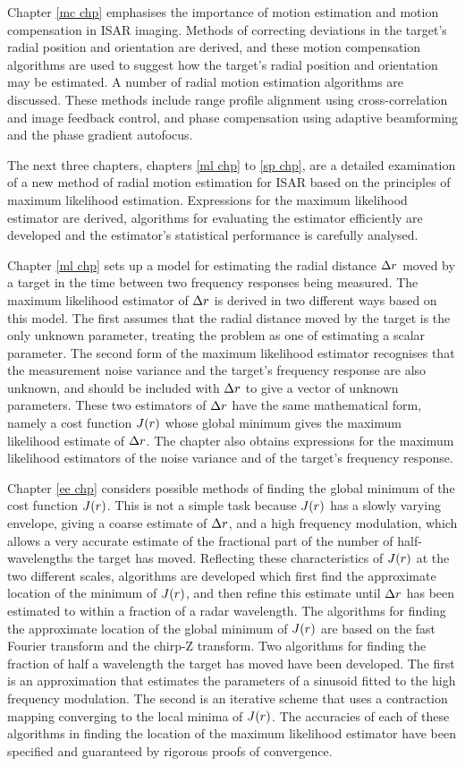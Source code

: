Chapter \ref{mc chp} emphasises the importance of motion estimation and
motion compensation in ISAR imaging.  Methods of correcting deviations in
the target's radial position and orientation are derived, and these motion
compensation algorithms are used to suggest how the target's radial
position and orientation may be estimated.  A number of radial motion
estimation algorithms are discussed.  These methods include range
profile alignment using cross-correlation and image feedback control, and
phase compensation using adaptive beamforming and the phase gradient
autofocus.

The next three chapters, chapters \ref{ml chp} to \ref{sp chp}, are a
detailed examination of a new method of radial motion estimation for ISAR
based on the principles of maximum likelihood estimation.  Expressions for
the maximum likelihood estimator are derived, algorithms for evaluating the
estimator efficiently are developed and the estimator's statistical
performance is carefully analysed.

Chapter \ref{ml chp} sets up a model for estimating the radial distance
${\Delta r}$ moved by a target in the time between two frequency responses being
measured.  The maximum likelihood estimator of ${\Delta r}$ is derived in two
different ways based on this model.  The first assumes that the radial
distance moved by the target is the only unknown parameter, treating the
problem as one of estimating a scalar parameter.  The second form of the
maximum likelihood estimator recognises that the measurement noise variance
and the target's frequency response are also unknown, and should be
included with ${\Delta r}$ to give a vector of unknown parameters.  These two
estimators of ${\Delta r}$ have the same mathematical form, namely a cost function
$J({r})$ whose global minimum gives the maximum likelihood estimate of
${\Delta r}$.  The chapter also obtains expressions for the maximum likelihood
estimators of the noise variance and of the target's frequency response.

Chapter \ref{ee chp} considers possible methods of finding the global
minimum of the cost function $J({r})$.  This is not a simple task because
$J({r})$ has a slowly varying envelope, giving a coarse estimate of ${\Delta r}$,
and a high frequency modulation, which allows a very accurate estimate of
the fractional part of the number of half-wavelengths the target has moved. 
Reflecting these characteristics of $J({r})$ at the two different scales,
algorithms are developed which first find the approximate location of the
minimum of $J({r})$, and then refine this estimate until ${\Delta r}$ has been
estimated to within a fraction of a radar wavelength.  The algorithms for
finding the approximate location of the global minimum of $J({r})$ are based
on the fast Fourier transform and the chirp-Z transform.  Two algorithms
for finding the fraction of half a wavelength the target has moved have
been developed. The first is an approximation that estimates the parameters
of a sinusoid fitted to the high frequency modulation.  The second is an
iterative scheme that uses a contraction mapping converging to the local
minima of $J({r})$.  The accuracies of each of these algorithms in finding
the location of the maximum likelihood estimator have been specified and 
guaranteed by rigorous proofs of convergence.

